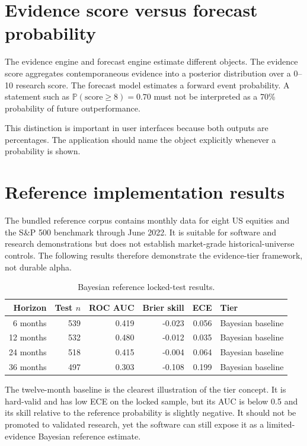 \documentclass[11pt]{article}
\newcommand{\Prb}{\mathbb{P}}
\begin{document}
\section{Evidence score versus forecast probability}
The evidence engine and forecast engine estimate different objects. The evidence score aggregates contemporaneous evidence into a posterior distribution over a 0--10 research score. The forecast model estimates a forward event probability. A statement such as $\Prb(\text{score}\ge 8)=0.70$ must not be interpreted as a 70\% probability of future outperformance.

This distinction is important in user interfaces because both outputs are percentages. The application should name the object explicitly whenever a probability is shown.

\section{Reference implementation results}
The bundled reference corpus contains monthly data for eight US equities and the S\&P 500 benchmark through June 2022. It is suitable for software and research demonstrations but does not establish market-grade historical-universe controls. The following results therefore demonstrate the evidence-tier framework, not durable alpha.

\begin{table}[ht]
\centering
\caption{Bayesian reference locked-test results.}
\begin{tabular}{rrrrrl}
\toprule
Horizon & Test $n$ & ROC AUC & Brier skill & ECE & Tier\\
\midrule
6 months  & 539 & 0.419 & -0.023 & 0.056 & Bayesian baseline\\
12 months & 532 & 0.480 & -0.012 & 0.035 & Bayesian baseline\\
24 months & 518 & 0.415 & -0.004 & 0.064 & Bayesian baseline\\
36 months & 497 & 0.303 & -0.108 & 0.199 & Bayesian baseline\\
\bottomrule
\end{tabular}
\end{table}

The twelve-month baseline is the clearest illustration of the tier concept. It is hard-valid and has low ECE on the locked sample, but its AUC is below 0.5 and its skill relative to the reference probability is slightly negative. It should not be promoted to validated research, yet the software can still expose it as a limited-evidence Bayesian reference estimate.
\end{document}
